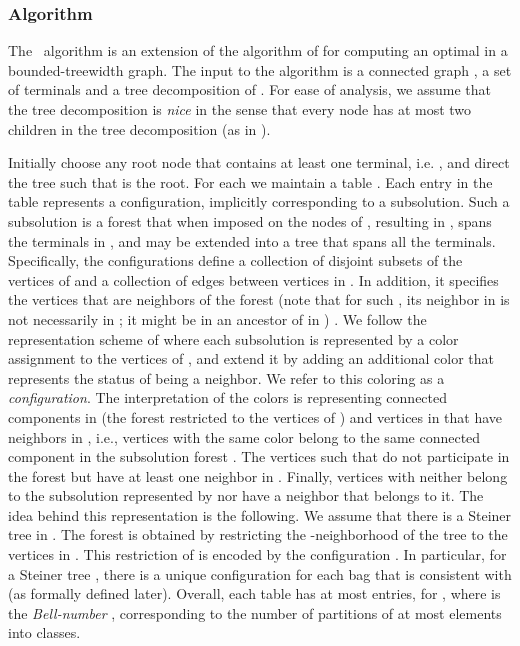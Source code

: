 \documentclass[12pt]{article}
\newcommand{\PS}[0]{ 
}
\begin{document}
\subsubsection{Algorithm}
The \PS\ algorithm is an extension of the algorithm of \cite{ChimaniMZ11} for computing an optimal  in a bounded-treewidth graph.
The input to the algorithm is a connected graph , a set of terminals  and a tree decomposition  of .
For ease of analysis, we assume that the tree decomposition  is \emph{nice} in the sense that every node  has at most two children  in the tree decomposition  (as in \cite{ChimaniMZ11}).
\par Initially choose any root node  that  contains at least one terminal, i.e. , and direct the tree  such that  is the root.
For each  we maintain a table . Each entry  in the table represents a configuration, implicitly corresponding to a subsolution. Such a subsolution is a forest  that when imposed on the nodes of , resulting in , spans the terminals  in , and  may be extended into a tree that spans all the terminals. Specifically, the configurations define a collection of disjoint subsets of the vertices of  and a collection of edges between vertices in . In addition, it specifies the vertices  that are neighbors of the forest  (note that for such , its neighbor in  is not necessarily in ; it might be in an ancestor of  in ) . We follow the representation scheme of \cite{ChimaniMZ11} where each subsolution is represented by a color assignment  to the vertices of , and extend it by adding an additional color  that represents the status of being a neighbor. We refer to this coloring as a \emph{configuration}. The interpretation of the colors is representing connected components in  (the forest  restricted to the vertices of ) and vertices in  that have neighbors in , i.e., vertices  with the same color  belong to the same connected component in the subsolution forest . The vertices  such that  do not participate in the forest but have at least one neighbor in . Finally, vertices  with  neither belong to the subsolution represented by  nor have a neighbor that belongs to it.
The idea behind this representation is the following. We assume that there is a Steiner tree  in . The forest  is obtained by restricting the -neighborhood of the tree  to the vertices in . This restriction of  is encoded by the configuration . In particular, for a Steiner tree , there is a unique configuration  for each bag  that is consistent with  (as formally defined later). Overall, each table  has at most  entries, for , where  is the \emph{Bell-number} \cite{ChimaniMZ11}, corresponding to the number of partitions of at most  elements into  classes.
\end{document}
